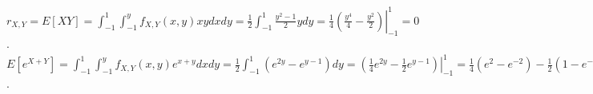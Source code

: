 \begin{pr}
$r_{X, Y}=E[XY]=\int_{-1}^1\int_{-1}^yf_{X, Y}(x, y)xydxdy=\frac12\int_{-1}^1\frac{y^2-1}2ydy=\left.\frac14(\frac{y^4}4-\frac{y^2}2)\right|_{-1}^1=0$.\\
$E[e^{X+Y}]=\int_{-1}^1\int_{-1}^yf_{X, Y}(x, y)e^{x+y}dxdy=\frac12\int_{-1}^1(e^{2y}-e^{y-1})dy=\left.\left(\frac14e^{2y}-\frac12e^{y-1}\right)\right|_{-1}^1=\frac14(e^2-e^{-2})-\frac12(1-e^{-2})=\frac14(e^2-2+e^{-2})=\left(\frac{e-\frac1e}2\right)^2$.
\end{pr}
